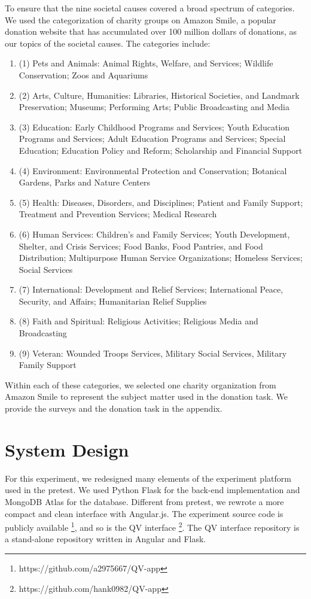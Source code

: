 To ensure that the nine societal causes covered a broad spectrum of categories. We used the categorization of charity groups on Amazon Smile, a popular donation website that has accumulated over 100 million dollars of donations, as our topics of the societal causes. The categories include:
\begin{enumerate}[label={},leftmargin=\parindent]
    \item (1) Pets and Animals: Animal Rights, Welfare, and Services; Wildlife Conservation; Zoos and Aquariums
    \item (2) Arts, Culture, Humanities: Libraries, Historical Societies, and Landmark Preservation; Museums; Performing Arts; Public Broadcasting and Media
    \item (3) Education: Early Childhood Programs and Services; Youth Education Programs and Services; Adult Education Programs and Services; Special Education; Education Policy and Reform; Scholarship and Financial Support
    \item (4) Environment: Environmental Protection and Conservation; Botanical Gardens, Parks and Nature Centers
    \item (5) Health: Diseases, Disorders, and Disciplines; Patient and Family Support; Treatment and Prevention Services; Medical Research
    \item (6) Human Services: Children's and Family Services; Youth Development, Shelter, and Crisis Services; Food Banks, Food Pantries, and Food Distribution; Multipurpose Human Service Organizations; Homeless Services; Social Services
    \item (7) International: Development and Relief Services; International Peace, Security, and Affairs; Humanitarian Relief Supplies
    \item (8) Faith and Spiritual: Religious Activities; Religious Media and Broadcasting
    \item (9) Veteran: Wounded Troops Services, Military Social Services, Military Family Support
\end{enumerate}
Within each of these categories, we selected one charity organization from Amazon Smile to represent the subject matter used in the donation task. We provide the surveys and the donation task in the appendix.

\section{System Design}
For this experiment, we redesigned many elements of the experiment platform used in the pretest. We used Python Flask for the back-end implementation and MongoDB Atlas for the database. Different from pretest, we rewrote a more compact and clean interface with Angular.js. The experiment source code is publicly available \footnote{https://github.com/a2975667/QV-app}, and so is the QV interface \footnote{https://github.com/hank0982/QV-app}. The QV interface repository is a stand-alone repository written in Angular and Flask.


